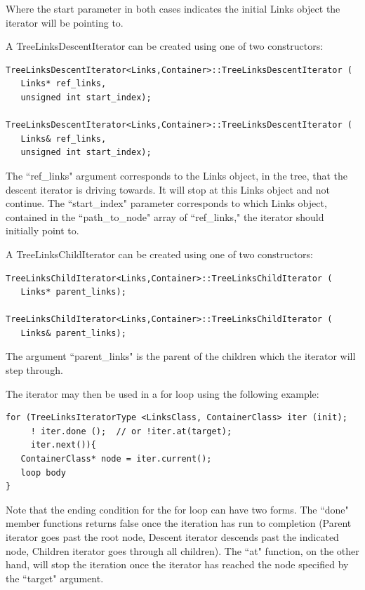 Where the start parameter in both cases indicates the initial Links
object the iterator will be pointing to.

A TreeLinksDescentIterator can be created using one of two constructors:

\begin{verbatim}
TreeLinksDescentIterator<Links,Container>::TreeLinksDescentIterator (
   Links* ref_links,
   unsigned int start_index);

TreeLinksDescentIterator<Links,Container>::TreeLinksDescentIterator (
   Links& ref_links,
   unsigned int start_index);
\end{verbatim}

The ``ref\_links" argument corresponds to the Links object, in the tree, that
the descent iterator is driving towards. It will stop at this Links object
and not continue. The ``start\_index" parameter corresponds to which Links
object, contained in the ``path\_to\_node" array of ``ref\_links," the iterator should
initially point to.

A TreeLinksChildIterator can be created using one of two constructors:

\begin{verbatim}
TreeLinksChildIterator<Links,Container>::TreeLinksChildIterator (
   Links* parent_links);

TreeLinksChildIterator<Links,Container>::TreeLinksChildIterator (
   Links& parent_links);
\end{verbatim}

The argument ``parent\_links" is the parent of the children which the iterator
will step through.

The iterator may then be used in a for loop using the following
example:

\begin{verbatim}
for (TreeLinksIteratorType <LinksClass, ContainerClass> iter (init);
     ! iter.done ();  // or !iter.at(target);
     iter.next()){
   ContainerClass* node = iter.current();
   loop body
}
\end{verbatim}

Note that the ending condition for the for loop can have two forms. The
``done" member functions returns false once the iteration has run
to completion (Parent iterator goes past the root node, Descent iterator
descends past the indicated node, Children iterator goes through all children).
The ``at" function, on the other hand,
will stop the iteration once the iterator has reached
the node specified by the ``target" argument.

